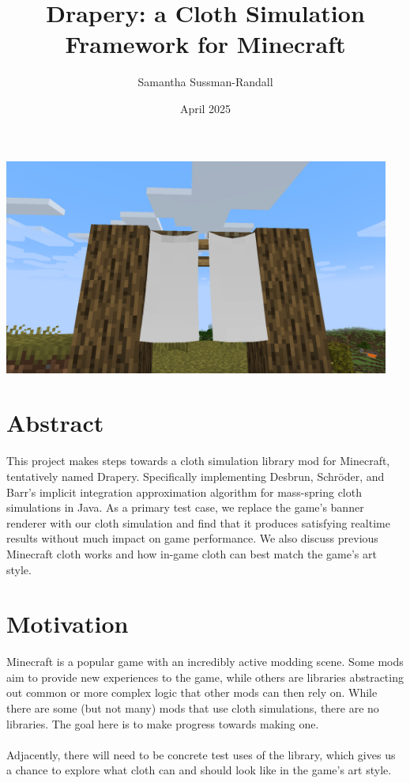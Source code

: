 \documentclass[12pt]{article}
\title{Drapery: a Cloth Simulation Framework for Minecraft}
\author{Samantha Sussman-Randall}
\date{April 2025}
\begin{document}
\maketitle

\begin{center}
    \includegraphics[width=5in]{images/bannerthin.png}
\end{center}

\section{Abstract}

This project makes steps towards a cloth simulation library mod for Minecraft, tentatively named Drapery. Specifically implementing Desbrun, Schröder, and Barr's implicit integration approximation algorithm for mass-spring cloth simulations in Java. As a primary test case, we replace the game's banner renderer with our cloth simulation and find that it produces satisfying realtime results without much impact on game performance. We also discuss previous Minecraft cloth works and how in-game cloth can best match the game's art style.

\section{Motivation}

Minecraft is a popular game with an incredibly active modding scene. Some mods aim to provide new experiences to the game, while others are libraries abstracting out common or more complex logic that other mods can then rely on. While there are some (but not many) mods that use cloth simulations, there are no libraries. The goal here is to make progress towards making one.\\
\\
Adjacently, there will need to be concrete test uses of the library, which gives us a chance to explore what cloth can and should look like in the game's art style.
\end{document}
